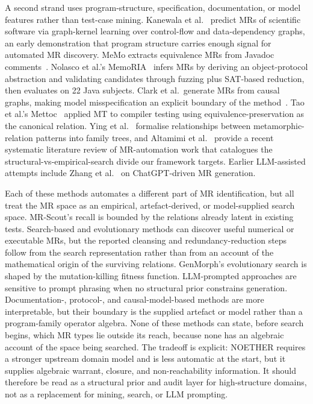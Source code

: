\documentclass[manuscript]{acmart}
\begin{document}
A second strand uses program-structure, specification, documentation, or model features rather than test-case mining. Kanewala et al.~\cite{Kanewala2016GraphKernel} predict MRs of scientific software via graph-kernel learning over control-flow and data-dependency graphs, an early demonstration that program structure carries enough signal for automated MR discovery. MeMo extracts equivalence MRs from Javadoc comments~\cite{Blasi2021MeMo}. Nolasco et al.'s MemoRIA~\cite{Nolasco2024MemoRIA} infers MRs by deriving an object-protocol abstraction and validating candidates through fuzzing plus SAT-based reduction, then evaluates on 22 Java subjects. Clark et al.\ generate MRs from causal graphs, making model misspecification an explicit boundary of the method~\cite{Clark2023CausalMT}. Tao et al.'s Mettoc~\cite{Tao2010Mettoc} applied MT to compiler testing using equivalence-preservation as the canonical relation. Ying et al.~\cite{Ying2025MRPatterns} formalise relationships between metamorphic-relation patterns into family trees, and Altamimi et al.~\cite{Altamimi2022MRSLR} provide a recent systematic literature review of MR-automation work that catalogues the structural-vs-empirical-search divide our framework targets. Earlier LLM-assisted attempts include Zhang et al.~\cite{ZhangChatGPTMR2023} on ChatGPT-driven MR generation.

Each of these methods automates a different part of MR identification, but all treat the MR space as an empirical, artefact-derived, or model-supplied search space. MR-Scout's recall is bounded by the relations already latent in existing tests. Search-based and evolutionary methods can discover useful numerical or executable MRs, but the reported cleansing and redundancy-reduction steps follow from the search representation rather than from an account of the mathematical origin of the surviving relations. GenMorph's evolutionary search is shaped by the mutation-killing fitness function. LLM-prompted approaches are sensitive to prompt phrasing when no structural prior constrains generation. Documentation-, protocol-, and causal-model-based methods are more interpretable, but their boundary is the supplied artefact or model rather than a program-family operator algebra. None of these methods can state, before search begins, which MR types lie outside its reach, because none has an algebraic account of the space being searched. The tradeoff is explicit: NOETHER requires a stronger upstream domain model and is less automatic at the start, but it supplies algebraic warrant, closure, and non-reachability information. It should therefore be read as a structural prior and audit layer for high-structure domains, not as a replacement for mining, search, or LLM prompting.
\end{document}
